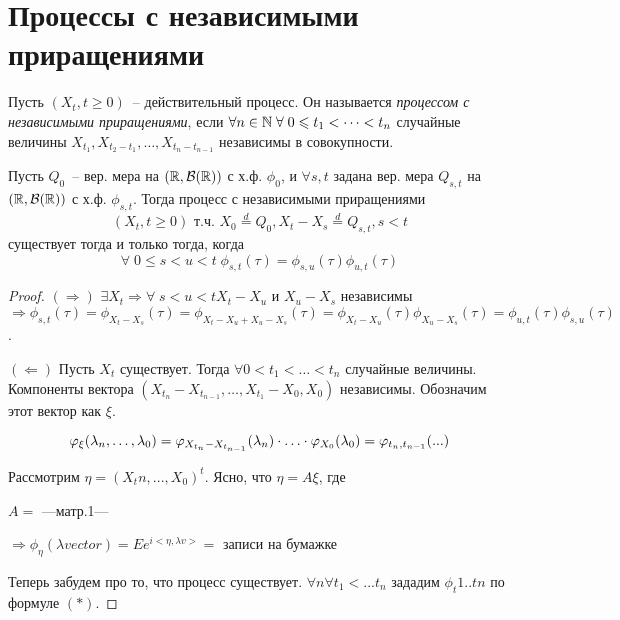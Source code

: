 \section{Процессы с независимыми приращениями}
\begin{definition}
Пусть $(X_t, t \geq 0)$~-- действительный процесс. Он называется \emph{процессом с
независимыми приращениями}, если $\forall n \in \mathbb{N} \; \forall \; 0 \leqslant t_1 < \dots < t_n$
случайные величины $X_{t_1}, X_{t_2 - t_1}, \dots, X_{t_n - t_{n-1}}$ независимы в совокупности.
\end{definition}

\begin{theorem}
Пусть $Q_0$~-- вер. мера на $(\mathbb{R}, \mathcal{B}(\mathbb{R}))$ с х.ф. $\phi_0$,
и $\forall s,t$ задана вер. мера $Q_{s,t}$ на $(\mathbb{R}, \mathcal{B}(\mathbb{R}))$ с х.ф. $\phi_{s,t}$.
Тогда процесс с независимыми приращениями
$$(X_t, t \geq 0) \text{ т.ч. } X_0 \overset{d}{=} Q_0, X_t - X_s \overset{d}{=} Q_{s,t}, s < t$$
существует тогда и только тогда, когда
$$\forall \; 0 \leq s < u < t \; \phi_{s,t}(\tau) = \phi_{s,u}(\tau) \phi_{u,t}(\tau)$$
\end{theorem}
\begin{proof} \forcenewline
$(\Rightarrow)$ $\exists X_t \Rightarrow \forall \; s < u < t X_t-X_u$ и
$X_u-X_s$ независимы $\Rightarrow \phi_{s,t}(\tau) = \phi_{X_t-X_s}(\tau)=
\phi_{X_t-X_u+X_u-X_s}(\tau) =
\phi_{X_t-X_u}(\tau) \phi_{X_u-X_s}(\tau) =
\phi_{u,t}(\tau) \phi_{s,u}(\tau)$.

$(\Leftarrow)$ Пусть $X_t$ существует. Тогда $\forall 0 < t_1 < \dots < t_n$
случайные величины. Компоненты вектора $(X_{t_n}-X_{t_{n-1}}, \dots, X_{t_1}-X_0, X_0)$
независимы. Обозначим этот вектор как $\xi$.

$$\varphi_\xi(\lambda_{n}, \dots, \lambda_{0}) =
\varphi_{X_{t_n}-X_{t_{n-1}}}(\lambda_n) \cdot \ldots \cdot \varphi_{X_0}(\lambda_0) =
\varphi_{t_n,t_{n-1}}(...)$$

Рассмотрим $\eta = (X_tn, ..., X_0)^t$. Ясно,  что $\eta = A\xi$, где

$A = $ ---матр.1---

$\Rightarrow \phi_\eta(\lambda vector) = Ee^{i <\eta, \lambda v>} = $
записи на бумажке

Теперь забудем про то, что процесс существует.
$\forall n \forall t_1 < ... t_n$ зададим $\phi_t1..tn$ по формуле $(*)$.
%
%
%
%
%
%
\end{proof}

